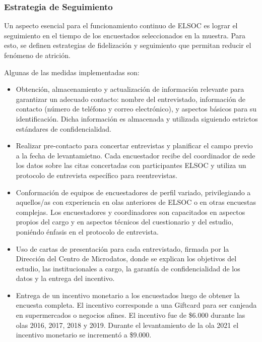 \documentclass[
  12pt,
]{article}
\begin{document}
\hypertarget{estrategia-de-seguimiento}{%
\subsubsection*{Estrategia de Seguimiento}\label{estrategia-de-seguimiento}}

Un aspecto esencial para el funcionamiento continuo de ELSOC es lograr el seguimiento en el tiempo de los encuestados seleccionados en la muestra. Para esto, se definen estrategias de fidelización y seguimiento que permitan reducir el fenómeno de atrición.

Algunas de las medidas implementadas son:

\begin{itemize}
\item
  Obtención, almacenamiento y actualización de información relevante para garantizar un adecuado contacto: nombre del entrevistado, información de contacto (número de teléfono y correo electrónico), y aspectos básicos para su identificación. Dicha información es almacenada y utilizada siguiendo estrictos estándares de confidencialidad.
\item
  Realizar pre-contacto para concertar entrevistas y planificar el campo previo a la fecha de levantamietno. Cada encuestador recibe del coordinador de sede los datos sobre las citas concertadas con participantes ELSOC y utiliza un protocolo de entrevista específico para reentrevistas.
\item
  Conformación de equipos de encuestadores de perfil variado, privilegiando a aquellos/as con experiencia en olas anteriores de ELSOC o en otras encuestas complejas. Los encuestadores y coordinadores son capacitados en aspectos propios del cargo y en aspectos técnicos del cuestionario y del estudio, poniéndo énfasis en el protocolo de entrevista.
\item
  Uso de cartas de presentación para cada entrevistado, firmada por la Dirección del Centro de Microdatos, donde se explican los objetivos del estudio, las institucionales a cargo, la garantía de confidencialidad de los datos y la entrega del incentivo.
\item
  Entrega de un incentivo monetario a los encuestados luego de obtener la encuesta completa. El incentivo corresponde a una Giftcard para ser canjeada en supermercados o negocios afines. El incentivo fue de \$6.000 durante las olas 2016, 2017, 2018 y 2019. Durante el levantamiento de la ola 2021 el incentivo monetario se incrementó a \$9.000.

\end{itemize}
\end{document}
